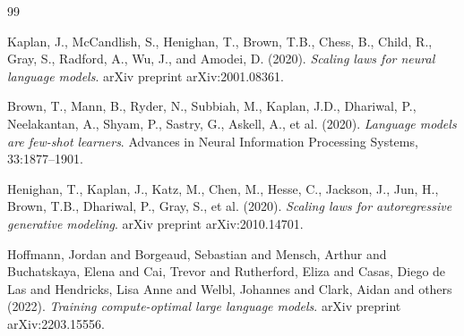 \documentclass{article}
\begin{document}
\begin{thebibliography}{99}

Kaplan, J., McCandlish, S., Henighan, T., Brown, T.B., Chess, B., Child, R., Gray, S., Radford, A., Wu, J., and Amodei, D. (2020).
\textit{Scaling laws for neural language models}.
arXiv preprint arXiv:2001.08361.

Brown, T., Mann, B., Ryder, N., Subbiah, M., Kaplan, J.D., Dhariwal, P., Neelakantan, A., Shyam, P., Sastry, G., Askell, A., et al. (2020).
\textit{Language models are few-shot learners}.
Advances in Neural Information Processing Systems, 33:1877--1901.

Henighan, T., Kaplan, J., Katz, M., Chen, M., Hesse, C., Jackson, J., Jun, H., Brown, T.B., Dhariwal, P., Gray, S., et al. (2020).
\textit{Scaling laws for autoregressive generative modeling}.
arXiv preprint arXiv:2010.14701.

Hoffmann, Jordan and Borgeaud, Sebastian and Mensch, Arthur and Buchatskaya, Elena and Cai, Trevor and Rutherford, Eliza and Casas, Diego de Las and Hendricks, Lisa Anne and Welbl, Johannes and Clark, Aidan and others (2022).
\textit{Training compute-optimal large language models}.
arXiv preprint arXiv:2203.15556.

\end{thebibliography}
\end{document}
